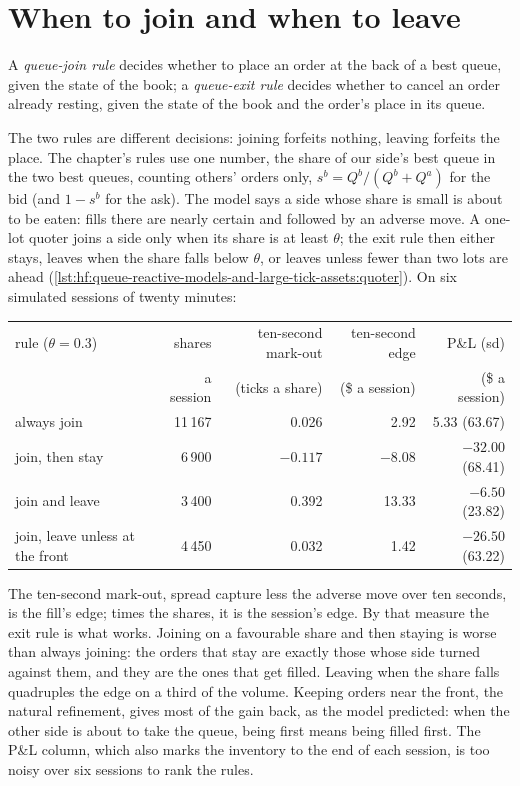 \section{When to join and when to leave}

\begin{definition}\label{def:hf:queue-reactive-models-and-large-tick-assets:rules}
A \emph{queue-join rule} decides whether to place an order at the back of a best queue, given the state of the book; a
\emph{queue-exit rule} decides whether to cancel an order already resting, given the state of the book and the order's place
in its queue.
\end{definition}

The two rules are different decisions: joining forfeits nothing, leaving forfeits the place. The chapter's rules use one number, the share of our
side's best queue in the two best queues, counting others' orders only, $s^b=Q^b/(Q^b+Q^a)$ for the bid (and $1-s^b$ for the ask). The model says a
side whose share is small is about to be eaten: fills there are nearly certain and followed by an adverse move. A one-lot quoter joins a side
only when its share is at least $\theta$; the exit rule then either stays, leaves when the share falls below $\theta$, or leaves unless fewer than
two lots are ahead (\cref{lst:hf:queue-reactive-models-and-large-tick-assets:quoter}). On six simulated sessions of twenty minutes:

\begin{center}
\small
\begin{tabular}{@{}lrrrr@{}}
\toprule
rule ($\theta=0.3$) & shares & ten-second mark-out & ten-second edge & P\&L (sd)\\
& a session & (ticks a share) & (\$ a session) & (\$ a session)\\
\midrule
always join & 11\,167 & 0.026 & 2.92 & 5.33 (63.67)\\
join, then stay & 6\,900 & $-0.117$ & $-8.08$ & $-32.00$ (68.41)\\
join and leave & 3\,400 & 0.392 & 13.33 & $-6.50$ (23.82)\\
join, leave unless at the front & 4\,450 & 0.032 & 1.42 & $-26.50$ (63.22)\\
\bottomrule
\end{tabular}
\end{center}

The ten-second mark-out, spread capture less the adverse move over ten seconds, is the fill's edge; times the shares, it is the session's edge. By
that measure the exit rule is what works. Joining on a favourable share and then staying is worse than always joining: the orders that stay are
exactly those whose side turned against them, and they are the ones that get filled. Leaving when the share falls quadruples the edge on a third of
the volume. Keeping orders near the front, the natural refinement, gives most of the gain back, as the model predicted: when the other side is
about to take the queue, being first means being filled first. The P\&L column, which also marks the inventory to the end of each session, is too
noisy over six sessions to rank the rules.

